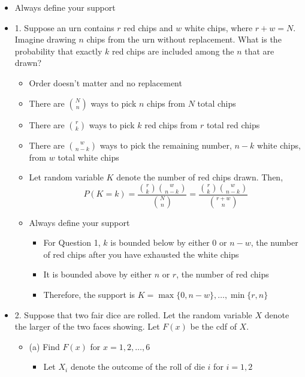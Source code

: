 \documentclass{article}
\begin{document}
\begin{itemize}
\subsection{Problem Set 3}
    \item Always define your support
    \item 1. Suppose an urn contains $r$ red chips and $w$ white chips, where $r + w = N$. Imagine drawing $n$ chips from the urn without replacement. What is the probability that exactly $k$ red chips are included among the $n$ that are drawn?
    \begin{itemize}
        \item Order doesn't matter and no replacement
        \item There are $\binom{N}{n}$ ways to pick $n$ chips from $N$ total chips
        \item There are $\binom{r}{k}$ ways to pick $k$ red chips from $r$ total red chips
        \item There are $\binom{w}{n-k}$ ways to pick the remaining number, $n-k$ white chips, from $w$ total white chips
        \item Let random variable $K$ denote the number of red chips drawn. Then,
        \[
        P(K=k) = \frac{\binom{r}{k}\binom{w}{n-k}}{\binom{N}{n}} = \frac{\binom{r}{k}\binom{w}{n-k}}{\binom{r+w}{n}}
        \]
        \item Always define your support
        \begin{itemize}
            \item For Question 1, $k$ is bounded below by either 0 or $n-w$, the number of red chips after you have exhausted the white chips
            \item It is bounded above by either $n$ or $r$, the number of red chips
            \item Therefore, the support is $K = \max\{0,n-w\}, \dots, \min\{r,n\}$
        \end{itemize}
    \end{itemize}
    \item 2. Suppose that two fair dice are rolled. Let the random variable $X$ denote the larger of the two faces showing. Let $F(x)$ be the cdf of $X$.
    \begin{itemize}
        \item (a) Find $F(x)$ for $x = 1, 2, \dots, 6$
        \begin{itemize}
            \item Let $X_i$ denote the outcome of the roll of die $i$ for $i=1,2$

\end{itemize}
\end{itemize}
\end{itemize}
\end{document}
